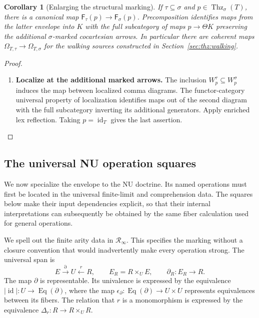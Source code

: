 \documentclass[oneside]{article}
\theoremstyle{plain}
\newtheorem{corollary}[theorem]{Corollary}
\theoremstyle{definition}
\theoremstyle{remark}
\newcommand{\Eq}{\operatorname{Eq}}
\newcommand{\RNU}{\mathcal R_{\infty}}
\newcommand{\Thz}{\operatorname{Thz}}
\newcommand{\id}{\operatorname{id}}
\begin{document}
\begin{corollary}[Enlarging the structural marking]
\label{cor:envelope-marking-functoriality}
If $\tau\subseteq\sigma$ and $p\in\Thz_\sigma(T)$, there is a
canonical map $\mathsf F_\tau(p)\to\mathsf F_\sigma(p)$.
Precomposition identifies maps from the latter envelope into $K$ with
the full subcategory of maps $p\to\Theta K$ preserving the additional
$\sigma$-marked cocartesian arrows. In particular there are coherent
maps $\Omega_{T,\tau}\to\Omega_{T,\sigma}$ for the walking sources
constructed in Section~\ref{sec:thz:walking}.
\end{corollary}
\begin{proof}
\leavevmode
\begin{enumerate}
\item \textbf{Localize at the additional marked arrows.}
The inclusion $W_p^\tau\subseteq W_p^\sigma$ induces the map between
localized comma diagrams. The functor-category universal property of
localization identifies maps out of the second diagram with the full
subcategory inverting its additional generators. Apply enriched lex
reflection. Taking $p=\id_T$ gives the last assertion.
\qedhere
\end{enumerate}
\end{proof}

\subsection{The universal NU operation squares}\label{subsec:nu-doctrine}

We now specialize the envelope to the NU doctrine. Its named operations
must first be located in the universal finite-limit and comprehension
data. The squares below make their input dependencies explicit, so that
their internal interpretations can subsequently be obtained by the same
fiber calculation used for general operations.

We spell out the finite arity data in $\RNU$. This specifies the marking
without a closure convention that would inadvertently make every operation
strong. The universal span is
\[
 E\xrightarrow{\partial}U\xleftarrow{r}R,
 \qquad E_R=R\times_U E,
 \qquad \partial_R:E_R\to R.
\]
The map $\partial$ is representable. Its univalence is expressed by the
equivalence $|\id|:U\to\Eq(\partial)$, where the map
$\epsilon_\partial:\Eq(\partial)\to U\times U$ represents equivalences
between its fibers. The relation that $r$ is a monomorphism is expressed by
the equivalence $\Delta_r:R\to R\times_U R$.
\end{document}

